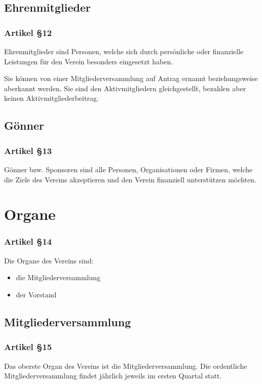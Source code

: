 \documentclass[a4paper,
               10pt,
               fleqn]{article}
\begin{document}
\subsection{Ehrenmitglieder}

\subsubsection*{Artikel §12}
Ehrenmitglieder sind Personen, welche sich durch persönliche
oder finanzielle Leistungen für den Verein besonders
eingesetzt haben.

Sie können von einer Mitgliederversammlung auf Antrag 
ernannt beziehungsweise aberkannt werden. Sie sind den
Aktivmitgliedern gleichgestellt, bezahlen aber keinen
Aktivmitgliederbeitrag.

\subsection{Gönner}

\subsubsection*{Artikel §13}
Gönner bzw. Sponsoren sind alle Personen, Organisationen 
oder Firmen, welche die Ziele des Vereins akzeptieren und
den Verein finanziell unterstützen möchten.

\section{Organe}

\subsubsection*{Artikel §14}
Die Organe des Vereins sind:
\begin{itemize}
\item die Mitgliederversammlung
\item der Vorstand
\end{itemize}

\subsection{Mitgliederversammlung}

\subsubsection*{Artikel §15}
Das oberste Organ des Vereins ist die Mitgliederversammlung.
Die ordentliche Mitgliederversammlung findet jährlich
jeweils im ersten Quartal statt.
\end{document}
